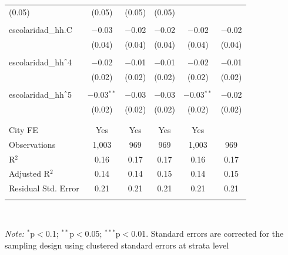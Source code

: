 \begin{table}[H]
\begin{tabularx}{0.9\textwidth}{@{\extracolsep{-7pt}}lccccc}
(0.05) & (0.05) & (0.05) & (0.05) \\    & & & & & \\   escolaridad\_hh.C & $-$0.03 & $-$0.02 & $-$0.02 & $-$0.02 & $-$0.02 \\    & (0.04) & (0.04) & (0.04) & (0.04) & (0.04) \\    & & & & & \\   escolaridad\_hh$\hat{\mkern6mu}$4 & $-$0.02 & $-$0.01 & $-$0.01 & $-$0.02 & $-$0.01 \\    & (0.02) & (0.02) & (0.02) & (0.02) & (0.02) \\    & & & & & \\   escolaridad\_hh$\hat{\mkern6mu}$5 & $-$0.03$^{**}$ & $-$0.03 & $-$0.03 & $-$0.03$^{**}$ & $-$0.02 \\    & (0.02) & (0.02) & (0.02) & (0.02) & (0.02) \\    & & & & & \\  \hline \\[-1.8ex]  City FE & Yes & Yes & Yes & Yes &  \\  Observations & 1,003 & 969 & 969 & 1,003 & 969 \\  R$^{2}$ & 0.16 & 0.17 & 0.17 & 0.16 & 0.17 \\  Adjusted R$^{2}$ & 0.14 & 0.14 & 0.15 & 0.14 & 0.15 \\  Residual Std. Error & 0.21 & 0.21 & 0.21 & 0.21 & 0.21 \\  \hline  \hline \\[-1.8ex]  \end{tabularx} \\ \parbox[]{\textwidth}{\textit{Note:} $^{*}$p$<$0.1; $^{**}$p$<$0.05; $^{***}$p$<$0.01. Standard errors are corrected for the sampling design using clustered standard errors at strata level }  \end{table} 